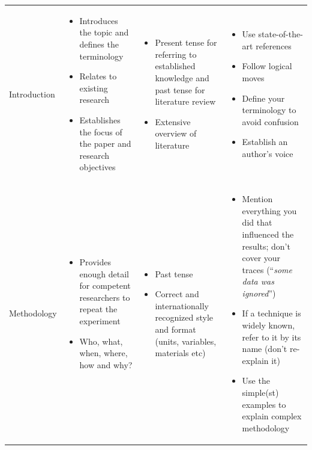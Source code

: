 \documentclass[graybox,envcountchap,sectrefs,UStrade]{svmono}
\begin{document}
{\begin{table}
\begin{tabular}{m{}m{}m{}m{}}
Introduction & \begin{itemize} \item Introduces the topic and defines the terminology \item Relates to existing research \item Establishes the focus of the paper and research objectives \end{itemize} & \begin{itemize} \item Present tense for referring to established knowledge and past tense for literature review \item Extensive overview of literature \end{itemize} & \begin{itemize} \item Use state-of-the-art references \item Follow logical moves \item Define your terminology to avoid confusion \item Establish an author's voice \end{itemize}  \\
Methodology & \begin{itemize} \item Provides enough detail for competent researchers to repeat the experiment \item Who, what, when, where, how and why? \end{itemize} & \begin{itemize} \item Past tense \item Correct and internationally recognized style and format (units, variables, materials etc) \end{itemize} & \begin{itemize} \item Mention everything you did that influenced the results; don't cover your traces (``\emph{some data was ignored}'') \item If a technique is widely known, refer to it by its name (don't re-explain it) \item Use the simple(st) examples to explain complex methodology \end{itemize} \\
\bottomrule
\end{tabular}
\end{table}
}
\end{document}
